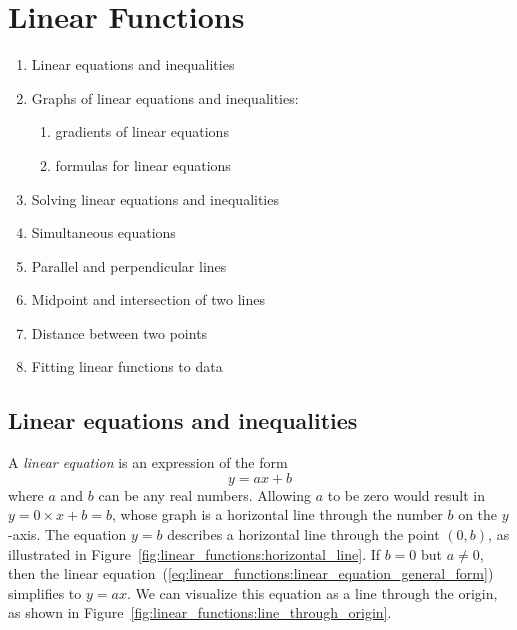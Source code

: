 
\chapter{Linear Functions}

\begin{enumerate}
\item Linear equations and inequalities

\item Graphs of linear equations and inequalities:
  \begin{enumerate}
  \item gradients of linear equations

  \item formulas for linear equations
  \end{enumerate}

\item Solving linear equations and inequalities

\item Simultaneous equations

\item Parallel and perpendicular lines

\item Midpoint and intersection of two lines

\item Distance between two points

\item Fitting linear functions to data
\end{enumerate}



\section{Linear equations and inequalities}

A \emph{linear equation} is an expression of the form
%
\begin{equation}
\label{eq:linear_functions:linear_equation_general_form}
y
=
ax + b
\end{equation}
%
where $a$ and $b$ can be any real numbers. Allowing $a$ to be zero
would result in $y = 0 \times x + b = b$, whose graph is a horizontal
line through the number $b$ on the $y$-axis. The equation $y = b$
describes a horizontal line through the point $(0, b)$, as illustrated
in Figure~\ref{fig:linear_functions:horizontal_line}. If $b = 0$ but
$a \neq 0$, then the linear
equation~(\ref{eq:linear_functions:linear_equation_general_form})
simplifies to $y = ax$. We can visualize this equation as a line
through the origin, as shown in
Figure~\ref{fig:linear_functions:line_through_origin}.

